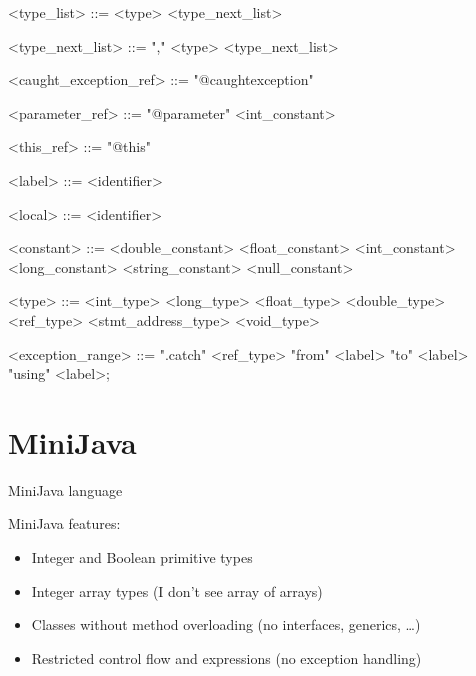 \documentclass{report}
\newcommand{\minijava}{MiniJava\xspace}
\begin{document}
\begin{grammar}
<type_list> ::= <type> <type_next_list>

<type_next_list> ::= "," <type> <type_next_list>

<caught_exception_ref> ::= "@caughtexception"

<parameter_ref> ::= "@parameter" <int_constant>

<this_ref> ::= "@this"

<label> ::= <identifier>

<local> ::= <identifier>

<constant> ::= <double_constant> \alt <float_constant> \alt <int_constant> \alt <long_constant>  <string_constant> \alt <null_constant>

<type> ::= <int_type> \alt <long_type> \alt <float_type> \alt <double_type> \alt <ref_type> <stmt_address_type> \alt <void_type>

<exception_range> ::= ".catch" <ref_type> "from" <label> "to" <label> "using" <label>;

\end{grammar}
\section{\minijava}
\label{sec:minijava}

\minijava language~\cite{miniJavaSyntax}

MiniJava features:
\begin{itemize}
\item Integer and Boolean primitive types
\item Integer array types (I don't see array of arrays)
\item Classes without method overloading (no interfaces, generics, \ldots)
\item Restricted control flow and expressions (no exception handling)
\end{itemize}
\end{document}
